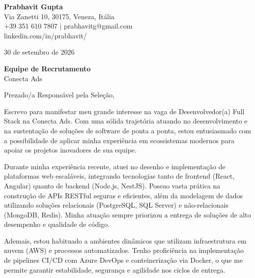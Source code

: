 \documentclass[11pt,a4paper]{article}
\begin{document}
\begin{flushleft}
    \textbf{Prabhavit Gupta} \\
    Via Zanetti 10, 30175, Veneza, Itália \\
    +39 351 610 7807 $\vert$ prabhavitg@gmail.com \\
    linkedin.com/in/prabhavit/
\end{flushleft}

\vspace{5mm}
\begin{flushright}
    30 de setembro de 2026
\end{flushright}

\vspace{5mm}
\begin{flushleft}
    \textbf{Equipe de Recrutamento} \\
    Conecta Ads \\
\end{flushleft}

\vspace{5mm}
\noindent Prezado/a Responsável pela Seleção,

\vspace{3mm}
\noindent Escrevo para manifestar meu grande interesse na vaga de Desenvolvedor(a) Full Stack na Conecta Ads. Com uma sólida trajetória atuando no desenvolvimento e na sustentação de soluções de software de ponta a ponta, estou entusiasmado com a possibilidade de aplicar minha experiência em ecossistemas modernos para apoiar os projetos inovadores de sua equipe.

\vspace{3mm}
\noindent Durante minha experiência recente, atuei no desenho e implementação de plataformas web escaláveis, integrando tecnologias tanto de frontend (React, Angular) quanto de backend (Node.js, NestJS). Possuo vasta prática na construção de APIs RESTful seguras e eficientes, além da modelagem de dados utilizando soluções relacionais (PostgreSQL, SQL Server) e não-relacionais (MongoDB, Redis). Minha atuação sempre priorizou a entrega de soluções de alto desempenho e qualidade de código.

\vspace{3mm}
\noindent Ademais, estou habituado a ambientes dinâmicos que utilizam infraestrutura em nuvem (AWS) e processos automatizados. Tenho proficiência na implementação de pipelines CI/CD com Azure DevOps e conteinerização via Docker, o que me permite garantir estabilidade, segurança e agilidade nos ciclos de entrega. 
\end{document}
